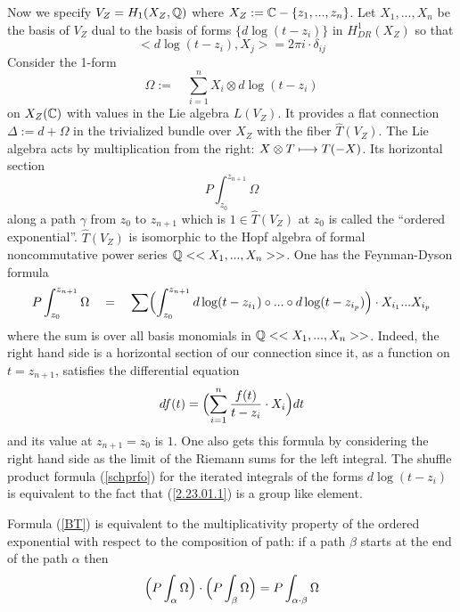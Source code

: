 \documentclass[10pt]{article}
\begin{document}
Now we specify $V_Z = H_1(X_Z, {\mathbb Q})$ where $X_Z:= {\mathbb C} - \{z_1, ..., z_n\}$. 
 Let $X_1, ..., X_n$ be the basis of $V_Z$ dual to 
the basis of forms $\{d\log (t- z_i)\} $  in $H_{DR}^1(X_Z)$ so that 
$$
<d\log (t- z_i), X_j> = 2\pi i \cdot \delta_{ij}
$$
Consider the 1-form 
$$
\Omega:= \quad \sum_{i=1}^n  X_i \otimes d\log (t- z_i)
$$
on  $X_{Z}({\mathbb C})$ 
with values in the Lie algebra $L(V_Z)$. 
It provides a flat connection $\Delta:= d+ \Omega$ 
in the trivialized bundle over $X_Z$ with the fiber $\widehat T(V_Z)$. The Lie algebra 
acts by multiplication from the right: $X \otimes T \longmapsto T (-X)$.  Its horizontal section 
\begin{equation} \label{2.23.01.1}
P\int_{z_0}^{z_{n+1}} \Omega 
\end{equation}
 along a path 
$\gamma$ from $z_0$ to $z_{n+1}$ which is $1 \in \widehat T(V_Z)$ at $z_0$      
is called   
the ``ordered exponential''. 
  $\widehat T(V_Z)$ is isomorphic to 
the Hopf algebra of formal noncommutative power series ${\mathbb Q}<<X_1, ..., X_n>>$. 
 One has 
the Feynman-Dyson formula 
$$
P\int_{z_0}^{z_{n+1}} \Omega \quad = \quad \sum \Bigl( \int_{z_0}^{z_{n+1}} 
d\log (t- z_{i_1}) \circ ... \circ 
d\log (t- z_{i_p})\Bigr) \cdot X_{i_1} ... X_{i_p}
$$
where the sum is over all basis monomials in ${\mathbb Q}<<X_1, ..., X_n>>$. 
Indeed, the right hand side is a horizontal  section 
of our connection since it, as a function on $t=z_{n+1}$, 
  satisfies the differential equation 
\begin{equation} \label{4.22.01.1}
df(t) = \Bigl( \sum_{i=1}^n \frac{f(t)}{t-z_i}\cdot X_i\Bigr) dt
\end{equation} 
and its value at $z_{n+1} =z_0$ is $1$. 
One also gets  this formula by considering the right hand side  as the limit of the 
Riemann sums for the left integral.  
The shuffle product formula (\ref{schprfo}) for the iterated integrals 
of the forms $d\log (t-z_i)$  is equivalent to the fact that (\ref{2.23.01.1}) 
is a group like element. 

Formula (\ref{BT}) is equivalent to the multiplicativity property of the 
ordered exponential with respect to the composition of path: if a path $\beta$ starts at the end of the path $\alpha$ then 
\begin{equation} \label{4.25.01.1}
\Bigl(P\int_{\alpha} \Omega\Bigr) \cdot \Bigl(P\int_{\beta} \Omega\Bigr)
  = P\int_{\alpha \cdot \beta} \Omega
\end{equation}
\end{document}
